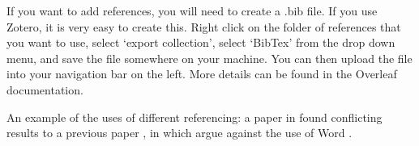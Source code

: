 

If you want to add references, you will need to create a .bib file. If you use Zotero, it is very easy to create this. Right click on the folder of references that you want to use, select `export collection', select `BibTex' from the drop down menu, and save the file somewhere on your machine. You can then upload the file into your navigation bar on the left. More details can be found in the Overleaf documentation.


An example of the uses of different referencing: a paper in \citeyear{scrivener_2019} found conflicting results to a previous paper \citep{scrivener_2019}, in which \citet{scrivener_2019} argue against the use of Word \citeyearpar{scrivener_2019}.